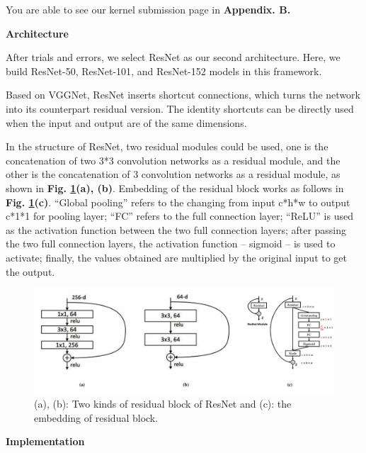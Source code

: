 \documentclass[a4paper]{article}
\begin{document}
\large{You are able to see our kernel submission page in \textbf{Appendix. B.}}

\vspace{2mm}
\begin{center}
\large\textbf{Architecture} \\
\end{center}


\large{
After trials and errors, we select \textsf{ResNet} as our second architecture. Here, we build \textsf{ResNet-50}, \textsf{ResNet-101}, and \textsf{ResNet-152} models in this framework. 

Based on \textsf{VGGNet}, \textsf{ResNet} inserts shortcut connections, which turns the network into its counterpart residual version. The identity shortcuts can be directly used when the input and output are of the same dimensions. 

In the structure of \textsf{ResNet}, two residual modules could be used, one is the concatenation of two 3*3 convolution networks as a residual module, and the other is the concatenation of 3 convolution networks as a residual module, as shown in \textbf{Fig. \ref{resblock}(a), (b)}. Embedding of the residual block works as follows in \textbf{Fig. \ref{resblock}(c)}. ``Global pooling'' refers to the changing from input c*h*w to output c*1*1 for pooling layer; ``FC'' refers to the full connection layer; ``ReLU'' is used as the activation function between the two full connection layers; after passing the two full connection layers, the activation function -- sigmoid -- is used to activate; finally, the values obtained are multiplied by the original input to get the output. 

\begin{figure}[h]
\centering
\includegraphics[width=15cm]{resblock.pdf}
\caption{ (a), (b): Two kinds of residual block of \textsf{ResNet} and (c): the embedding of residual block.}
\label{resblock}
\end{figure}

}

\vspace{2mm}
\begin{center}
\large\textbf{Implementation} \\
\end{center}
\end{document}
